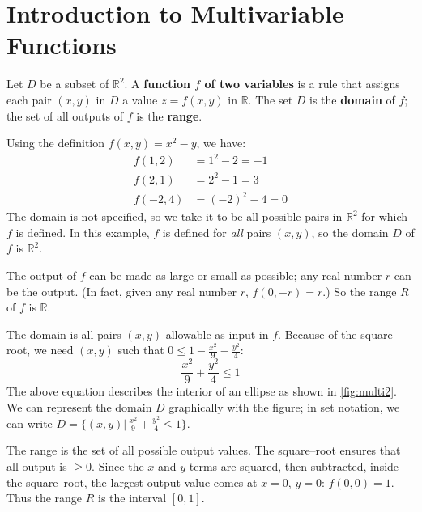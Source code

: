\section{Introduction to Multivariable Functions}\label{sec:multi_intro}

{Let $D$ be a subset of $\mathbb{R}^2$. A \textbf{function $f$ of two variables} is a rule that assigns each pair $(x,y)$ in $D$ a value $z=f(x,y)$ in $\mathbb{R}$. The set $D$ is the \textbf{domain} of $f$; the set of all outputs of $f$ is the \textbf{range}.
}


{Using the definition $f(x,y) = x^2-y$, we have:
\begin{align*}
f(1,2) &= 1^2-2 = -1\\
f(2,1) &=	2^2-1 = 3\\
f(-2,4) &= (-2)^2-4 = 0
\end{align*}
The domain is not specified, so we take it to be all possible pairs in $\mathbb{R}^2$ for which $f$ is defined. In this example, $f$ is defined for \emph{all} pairs $(x,y)$, so the domain $D$ of $f$ is $\mathbb{R}^2$. 

The output of $f$ can be made as large or small as possible; any real number $r$ can be the output. (In fact, given any real number $r$, $f(0,-r)=r$.) So the range $R$ of $f$ is $\mathbb{R}$.}

{The domain is all pairs $(x,y)$ allowable as input in $f$. Because of the square--root, we need $(x,y)$ such that $0\leq1-\frac{x^2}9-\frac{y^2}4$:
\[\frac{x^2}9+\frac{y^2}4 \leq 1\]
The above equation describes the interior of an ellipse as shown in \autoref{fig:multi2}. We can represent the domain $D$ graphically with the figure; in set notation, we can write $D = \{(x,y)|\,\frac{x^2}9+\frac{y^2}4 \leq 1\}$.

The range is the set of all possible output values. The square--root ensures that all output is $\geq 0$. Since the $x$ and $y$ terms are squared, then subtracted, inside the square--root, the largest output value comes at $x=0$, $y=0$: $f(0,0) = 1$. Thus the range $R$ is the interval $[0,1]$.}

